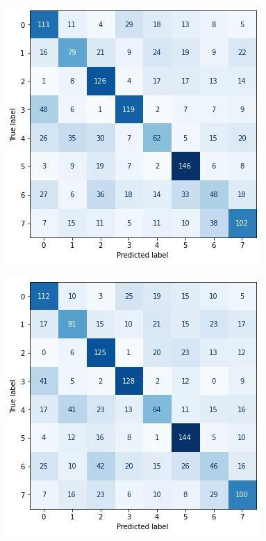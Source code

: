 \begin{figure}[ht]
\centering
\includegraphics[scale=0.6]{images/best_vgg16_svmrbf.jpg}
\caption{}
\label{fig:best_vgg16_svmrbf_cm}
\end{figure}

\begin{figure}[ht]
\centering
\includegraphics[scale=0.6]{images/best_resnet50_svmrbf.jpg}
\caption{}
\label{fig:best_resnet50_svmrbf_cm}
\end{figure}

\begin{table}[ht]
\centering
{}
\caption{...}
\label{tab:my-table}
\end{table}